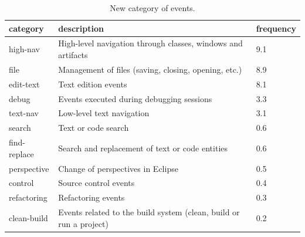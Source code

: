 \documentclass[times]{smrauth}
\begin{document}

\begin{table}[ht!]
	\tiny
	\renewcommand{\arraystretch}{1.3}
	\caption{New category of events. }
	\label{tbl:new_events_udc}
	\centering
	\begin{tabular}{|p{2.5cm}|p{6 cm}| p{1cm} |}
		\hline 
		category & description & frequency \\  
		\hline 
		\hline 
		high-nav & High-level navigation through classes, windows and artifacts & 9.1 \\
		file & Management of files (saving, closing, opening, etc.) &	8.9 \\
		edit-text & Text edition events & 8.1 \\
		debug & Events executed during debugging sessions & 3.3 \\
		text-nav & Low-level text navigation & 3.1 \\
		search & Text or code search & 0.6 \\
		find-replace & Search and replacement of text or code entities & 0.6 \\
		perspective & Change of perspectives in Eclipse & 0.5  \\
		control & Source control events & 0.4 \\
		refactoring & Refactoring events & 0.3\\
		clean-build &  Events related to the build system (clean, build or run a project) & 0.2\\
		\hline
	\end{tabular}
\end{table}
\end{document}
